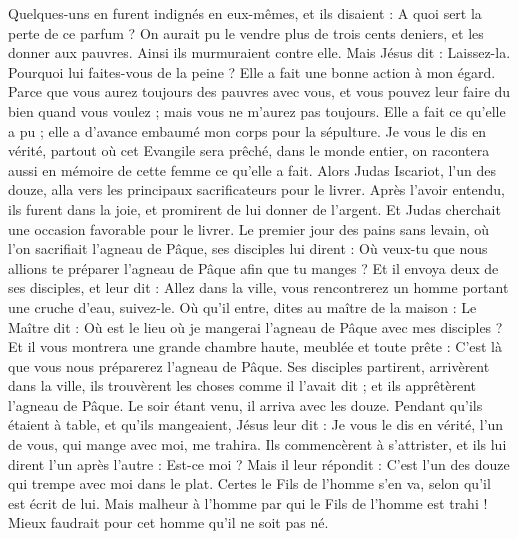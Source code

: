 \begin{multicols}{2}
Quelques-uns en furent indignés en eux-mêmes, et ils disaient : A quoi sert la perte de ce parfum ?
On aurait pu le vendre plus de trois cents deniers, et les donner aux pauvres. Ainsi ils murmuraient contre elle.
Mais Jésus dit : Laissez-la. Pourquoi lui faites-vous de la peine ? Elle a fait une bonne action à mon égard.
Parce que vous aurez toujours des pauvres avec vous, et vous pouvez leur faire du bien quand vous voulez ; mais vous ne m'aurez pas toujours.
Elle a fait ce qu’elle a pu ; elle a d’avance embaumé mon corps pour la sépulture.
Je vous le dis en vérité, partout où cet Evangile sera prêché, dans le monde entier, on racontera aussi en mémoire de cette femme ce qu’elle a fait.
Alors Judas Iscariot, l'un des douze, alla vers les principaux sacrificateurs pour le livrer.
Après l’avoir entendu, ils furent dans la joie, et promirent de lui donner de l'argent. Et Judas cherchait une occasion favorable pour le livrer.
Le premier jour des pains sans levain, où l’on sacrifiait l'agneau de Pâque, ses disciples lui dirent : Où veux-tu que nous allions te préparer l'agneau de Pâque afin que tu manges ?
Et il envoya deux de ses disciples, et leur dit : Allez dans la ville, vous rencontrerez un homme portant une cruche d'eau, suivez-le.
Où qu’il entre, dites au maître de la maison : Le Maître dit : Où est le lieu où je mangerai l'agneau de Pâque avec mes disciples ?
Et il vous montrera une grande chambre haute, meublée et toute prête : C’est là que vous nous préparerez l'agneau de Pâque.
Ses disciples partirent, arrivèrent dans la ville, ils trouvèrent les choses comme il l’avait dit ; et ils apprêtèrent l'agneau de Pâque.
Le soir étant venu, il arriva avec les douze.
Pendant qu’ils étaient à table, et qu'ils mangeaient, Jésus leur dit : Je vous le dis en vérité, l'un de vous, qui mange avec moi, me trahira.
Ils commencèrent à s'attrister, et ils lui dirent l'un après l'autre : Est-ce moi ?
Mais il leur répondit : C'est l'un des douze qui trempe avec moi dans le plat.
Certes le Fils de l'homme s'en va, selon qu'il est écrit de lui. Mais malheur à l'homme par qui le Fils de l'homme est trahi ! Mieux faudrait pour cet homme qu’il ne soit pas né.

\end{multicols}
